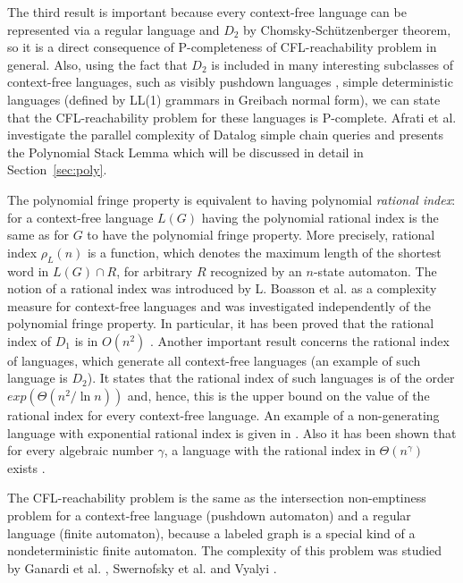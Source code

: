 \documentclass{ws-ijfcs}
\begin{document}
The third result is important because every context-free language can be represented via a regular language and $D_2$ by Chomsky-Sch{\"u}tzenberger theorem, so it is a direct consequence of P-completeness of CFL-reachability problem in general. Also, using the fact that $D_2$ is included in many interesting subclasses of context-free languages, such as visibly pushdown languages \cite{Okhotin2014ComplexityOI}, simple deterministic languages (defined by LL(1) grammars in Greibach normal form), we can state that the CFL-reachability problem for these languages is P-complete. Afrati et al. \cite{ChainQ} investigate the parallel complexity of Datalog simple chain queries and presents the Polynomial Stack Lemma which will be discussed in detail in Section~\ref{sec:poly}. 


The polynomial fringe property is equivalent to having polynomial \textit{rational index}: for a context-free language $L(G)$ having the polynomial rational index is the same as for $G$ to have the polynomial fringe property. More precisely, rational index $\rho_L(n)$ is a function, which denotes the maximum length of the shortest word in $L(G) \cap R$, for arbitrary $R$ recognized by an $n$-state automaton. The notion of a rational index was introduced by L. Boasson et al. \cite{RatBasic} as a complexity measure for context-free languages and was investigated independently of the polynomial fringe property.  In particular, it has been proved that the rational index of $D_1$ is in $O( n^2)$ \cite{Dyck1}. 
Another important result concerns the rational index of languages, which generate all context-free languages (an example of such language is $D_2$). It states that the rational index of such languages is of the order $exp(\Theta(n^2/\ln n))$ \cite{CFRat} and, hence, this is the upper bound on the value of the rational index for every context-free language. An example of a non-generating language with exponential rational index is given in \cite{Regularrealizability}. Also it has been shown that for every algebraic number $\gamma $, a language with the rational index in $\Theta (n^\gamma )$ exists \cite{GreibRat}. 


The CFL-reachability problem is the same as the intersection non-emptiness problem for a context-free language (pushdown automaton) and a regular language (finite automaton), because a labeled graph is a special kind of a nondeterministic finite automaton. The complexity of this problem was studied by Ganardi et al. \cite{ ganardi2016circuit},  Swernofsky et al. \cite{Intersection} and Vyalyi \cite{VyalyiRR}.
\end{document}
